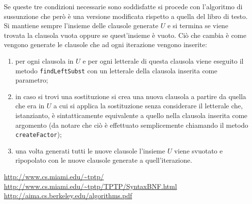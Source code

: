 \documentclass[a4paper,11pt]{article}
\makeatletter
\let\@orig@endthebibliography\endthebibliography
\renewcommand\endthebibliography{
\xdef\@kept@last@number{\the\c@enumiv}
\@orig@endthebibliography}
\newenvironment{thesitography}[1]
{\def\refname{Siti consultati}%
\thebibliography{#1}%
\setcounter{enumiv}{\@kept@last@number}%
}
	{\@orig@endthebibliography}
\makeatother
\begin{document}
Se queste tre condizioni necessarie sono soddisfatte si procede con l'algoritmo di sussunzione che però è una versione modificata rispetto a quella del libro di testo. Si mantiene sempre l'insieme delle clausole generate $U$ e si termina se viene trovata la clausola vuota oppure se quest'insieme è vuoto. Ciò che cambia è come vengono generate le clausole che ad ogni iterazione vengono inserite:
\begin{enumerate}
\item per ogni clausola in $U$ e per ogni letterale di questa clausola viene eseguito il metodo \texttt{findLeftSubst} con un letterale della clausola inserita come parametro;
\item in caso si trovi una sostituzione si crea una nuova clausola a partire da quella che era in $U$ a cui si applica la sostituzione senza considerare il letterale che, istanzianto, è sintatticamente equivalente a quello nella clausola inserita come argomento (da notare che ciò è effettuato semplicemente chiamando il metodo \texttt{createFactor});
\item una volta generati tutti le nuove clausole l'insieme $U$ viene svuotato e ripopolato con le nuove clausole generate a quell'iterazione.
\end{enumerate}

\begin{thesitography}{9}
\url{http://www.cs.miami.edu/~tptp/}
\url{http://www.cs.miami.edu/~tptp/TPTP/SyntaxBNF.html}		
\url{http://aima.cs.berkeley.edu/algorithms.pdf}
\end{thesitography}
\end{document}
